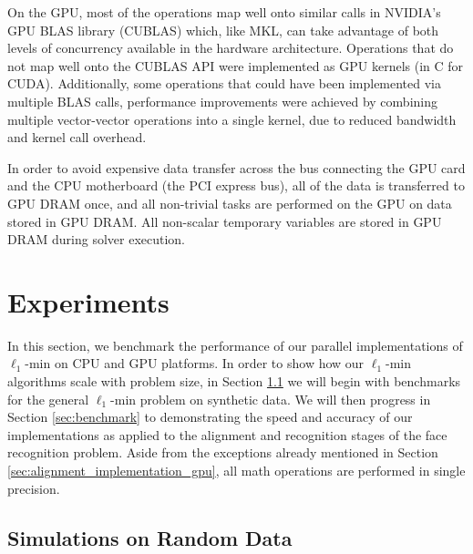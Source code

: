 \documentclass[10pt,twocolumn,letterpaper]{article}
\begin{document}
On the GPU, most of the operations map well onto similar calls in NVIDIA's GPU
BLAS library (CUBLAS) which, like MKL, can take advantage of both levels of
concurrency available in the hardware architecture.  Operations that do not map
well onto the CUBLAS API were implemented as GPU kernels (in C for CUDA).
Additionally, some operations that could have been implemented via multiple
BLAS calls, performance improvements were achieved by combining multiple
vector-vector operations into a single kernel, due to reduced bandwidth and
kernel call overhead.  

In order to avoid expensive data transfer across the bus connecting the GPU
card and the CPU motherboard (the PCI express bus), all of the data is
transferred to GPU DRAM once, and all non-trivial tasks are performed on the
GPU on data stored in GPU DRAM.  
All non-scalar temporary variables are stored in GPU DRAM
during solver execution. 

\section{Experiments} \label{sec:experiment} In this section, we benchmark the
performance of our parallel implementations of $\ell_1$-min on CPU and GPU
platforms.  In order to show how our $\ell_1$-min algorithms scale with problem
size, in Section \ref{sec:simulation} we will begin with benchmarks for the
general $\ell_1$-min problem on synthetic data.  We will then progress in
Section \ref{sec:benchmark} to demonstrating the speed and accuracy of our
implementations as applied to the alignment and recognition stages of the face
recognition problem.
Aside from the exceptions already mentioned in Section
\ref{sec:alignment_implementation_gpu}, all math operations are performed in
single precision.

\subsection{Simulations on Random Data}
\label{sec:simulation}
\end{document}

